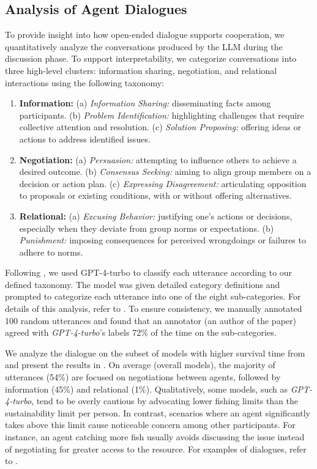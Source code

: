 \documentclass{article}
\begin{document}
\subsection{Analysis of Agent Dialogues}
To provide insight into how open-ended dialogue supports cooperation, we quantitatively analyze the conversations produced by the LLM during the discussion phase. To support interpretability, we categorize conversations into three high-level clusters: information sharing, negotiation, and relational interactions using the following taxonomy:
%
\begin{enumerate}
[itemsep=0.5em,topsep=0em
%
]
    \item \textbf{Information:} (a) \textit{Information Sharing:} disseminating facts among participants. (b) \textit{Problem Identification:} highlighting challenges that require collective attention and resolution. (c) \textit{Solution Proposing:} offering ideas or actions to address identified issues.
    \item  \textbf{Negotiation:} (a) \textit{Persuasion:} attempting to influence others to achieve a desired outcome. (b) \textit{Consensus Seeking:} aiming to align group members on a decision or action plan. (c) \textit{Expressing Disagreement:} articulating opposition to proposals or existing conditions, with or without offering alternatives.
    \item \textbf{Relational:} (a) \textit{Excusing Behavior: } justifying one's actions or decisions, especially when they deviate from group norms or expectations.
    (b) \textit{Punishment:} imposing consequences for perceived wrongdoings or failures to adhere to norms.


\end{enumerate}
Following \citet{gilardi2023chatgpt}, we used GPT-4-turbo to classify each utterance according to our defined taxonomy. The model was given detailed category definitions and prompted to categorize each utterance into one of the eight sub-categories. For details of this analysis, refer to . To ensure consistency, we manually annotated 100 random utterances and found that an annotator (an author of the paper) agreed with \textit{GPT-4-turbo}'s labels 72\% of the time on the sub-categories.

We analyze the dialogue on the subset of models with higher survival time from  and present the results in . On average (overall models), the majority of utterances (54\%) are focused on negotiations between agents, followed by information (45\%) and relational (1\%). 
Qualitatively, some models, such as \textit{GPT-4-turbo}, tend to be overly cautious by advocating lower fishing limits than the sustainability limit per person. In contrast, scenarios where an agent significantly takes above this limit cause noticeable concern among other participants. For instance, an agent catching more fish usually avoids discussing the issue instead of negotiating for greater access to the resource. For examples of dialogues, refer to .
\end{document}

